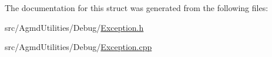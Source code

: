 The documentation for this struct was generated from the following files\+:\begin{DoxyCompactItemize}
\item 
src/\+Agmd\+Utilities/\+Debug/\hyperlink{_exception_8h}{Exception.\+h}\item 
src/\+Agmd\+Utilities/\+Debug/\hyperlink{_exception_8cpp}{Exception.\+cpp}\end{DoxyCompactItemize}
